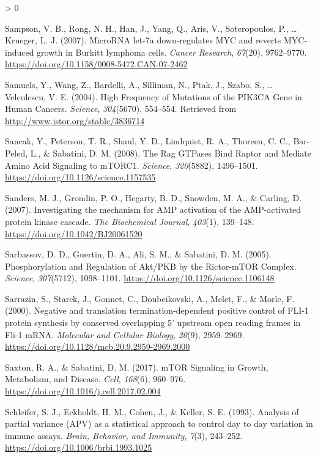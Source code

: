 \documentclass[
  12pt,
  openany]{book}
\newlength{\cslhangindent}
\newenvironment{CSLReferences}[2] %
 {%
  \setlength{\parindent}{0pt}
  \ifodd #1 \everypar{\setlength{\hangindent}{\cslhangindent}}\ignorespaces\fi
  \ifnum #2 > 0
  \setlength{\parskip}{#2\baselineskip}
  \fi
 }%
 {}
\begin{document}
\begin{CSLReferences}{1}{0}
\leavevmode\hypertarget{ref-Sampson2007}{}%
Sampson, V. B., Rong, N. H., Han, J., Yang, Q., Aris, V., Soteropoulos, P., \ldots{} Krueger, L. J. (2007). {MicroRNA} let-7a down-regulates {MYC} and reverts {MYC}-induced growth in {Burkitt} lymphoma cells. \emph{Cancer Research}, \emph{67}(20), 9762--9770. \url{https://doi.org/10.1158/0008-5472.CAN-07-2462}

\leavevmode\hypertarget{ref-Samuels2004}{}%
Samuels, Y., Wang, Z., Bardelli, A., Silliman, N., Ptak, J., Szabo, S., \ldots{} Velculescu, V. E. (2004). High {Frequency} of {Mutations} of the {PIK3CA Gene} in {Human Cancers}. \emph{Science}, \emph{304}(5670), 554--554. Retrieved from \url{http://www.jstor.org/stable/3836714}

\leavevmode\hypertarget{ref-Sancak2008}{}%
Sancak, Y., Peterson, T. R., Shaul, Y. D., Lindquist, R. A., Thoreen, C. C., Bar-Peled, L., \& Sabatini, D. M. (2008). The {Rag GTPases Bind Raptor} and {Mediate Amino Acid Signaling} to {mTORC1}. \emph{Science}, \emph{320}(5882), 1496--1501. \url{https://doi.org/10.1126/science.1157535}

\leavevmode\hypertarget{ref-Sanders2007}{}%
Sanders, M. J., Grondin, P. O., Hegarty, B. D., Snowden, M. A., \& Carling, D. (2007). Investigating the mechanism for {AMP} activation of the {AMP}-activated protein kinase cascade. \emph{The Biochemical Journal}, \emph{403}(1), 139--148. \url{https://doi.org/10.1042/BJ20061520}

\leavevmode\hypertarget{ref-Sarbassov2005}{}%
Sarbassov, D. D., Guertin, D. A., Ali, S. M., \& Sabatini, D. M. (2005). Phosphorylation and {Regulation} of {Akt}/{PKB} by the {Rictor}-{mTOR Complex}. \emph{Science}, \emph{307}(5712), 1098--1101. \url{https://doi.org/10.1126/science.1106148}

\leavevmode\hypertarget{ref-Sarrazin2000}{}%
Sarrazin, S., Starck, J., Gonnet, C., Doubeikovski, A., Melet, F., \& Morle, F. (2000). Negative and translation termination-dependent positive control of {FLI}-1 protein synthesis by conserved overlapping 5' upstream open reading frames in {Fli}-1 {mRNA}. \emph{Molecular and Cellular Biology}, \emph{20}(9), 2959--2969. \url{https://doi.org/10.1128/mcb.20.9.2959-2969.2000}

\leavevmode\hypertarget{ref-Saxton2017}{}%
Saxton, R. A., \& Sabatini, D. M. (2017). {mTOR Signaling} in {Growth}, {Metabolism}, and {Disease}. \emph{Cell}, \emph{168}(6), 960--976. \url{https://doi.org/10.1016/j.cell.2017.02.004}

\leavevmode\hypertarget{ref-Schleifer1993}{}%
Schleifer, S. J., Eckholdt, H. M., Cohen, J., \& Keller, S. E. (1993). Analysis of partial variance ({APV}) as a statistical approach to control day to day variation in immune assays. \emph{Brain, Behavior, and Immunity}, \emph{7}(3), 243--252. \url{https://doi.org/10.1006/brbi.1993.1025}


\end{CSLReferences}
\end{document}
